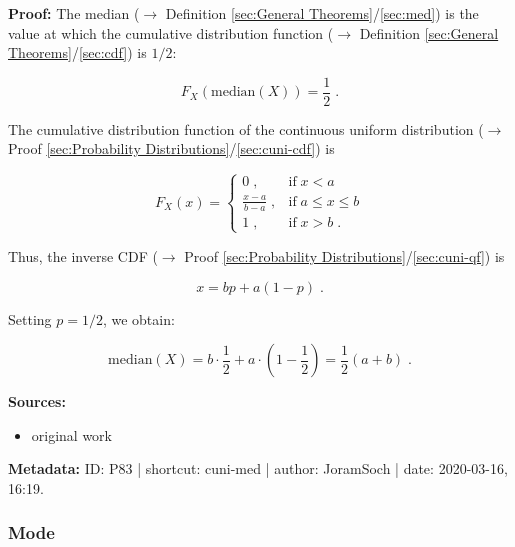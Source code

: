 \documentclass[a4paper,12pt,twoside]{book}
\begin{document}
\vspace{1em}
\textbf{Proof:} The median ($\rightarrow$ Definition \ref{sec:General Theorems}/\ref{sec:med}) is the value at which the cumulative distribution function ($\rightarrow$ Definition \ref{sec:General Theorems}/\ref{sec:cdf}) is $1/2$:

\begin{equation} \label{eq:cuni-med-median}
F_X(\mathrm{median}(X)) = \frac{1}{2} \; .
\end{equation}

The cumulative distribution function of the continuous uniform distribution ($\rightarrow$ Proof \ref{sec:Probability Distributions}/\ref{sec:cuni-cdf}) is

\begin{equation} \label{eq:cuni-med-cuni-cdf}
F_X(x) = \left\{
\begin{array}{rl}
0 \; , & \text{if} \; x < a \\
\frac{x-a}{b-a} \; , & \text{if} \; a \leq x \leq b \\
1 \; , & \text{if} \; x > b \; .
\end{array}
\right.
\end{equation}

Thus, the inverse CDF ($\rightarrow$ Proof \ref{sec:Probability Distributions}/\ref{sec:cuni-qf}) is

\begin{equation} \label{eq:cuni-med-cuni-cdf-inv}
x = bp + a(1-p) \; .
\end{equation}

Setting $p = 1/2$, we obtain:

\begin{equation} \label{eq:cuni-med-cuni-med-qed}
\mathrm{median}(X) = b \cdot \frac{1}{2} + a \cdot \left( 1-\frac{1}{2} \right) = \frac{1}{2} (a+b) \; .
\end{equation}


\vspace{1em}
\textbf{Sources:}
\begin{itemize}
\item original work\end{itemize}


\vspace{1em}
\textbf{Metadata:} ID: P83 | shortcut: cuni-med | author: JoramSoch | date: 2020-03-16, 16:19.
\vspace{1em}



\subsubsection[\textbf{Mode}]{Mode} \label{sec:cuni-med}
\setcounter{equation}{0}
\end{document}
